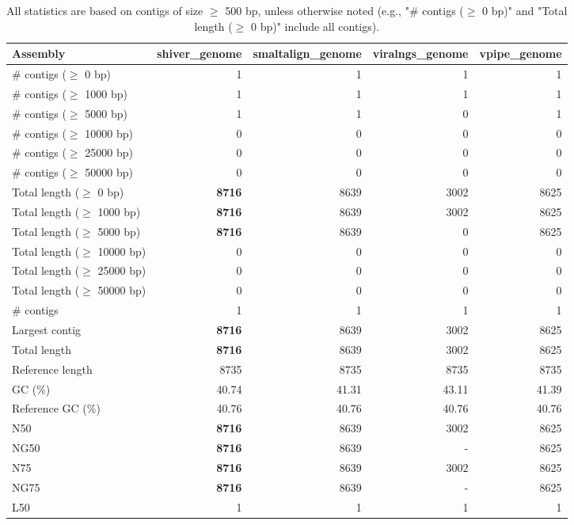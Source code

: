 \documentclass[12pt,a4paper]{article}
\begin{document}
\begin{table}[ht]
\begin{center}
\caption{All statistics are based on contigs of size $\geq$ 500 bp, unless otherwise noted (e.g., "\# contigs ($\geq$ 0 bp)" and "Total length ($\geq$ 0 bp)" include all contigs).}
\begin{tabular}{|l*{4}{|r}|}
\hline
Assembly & shiver\_genome & smaltalign\_genome & viralngs\_genome & vpipe\_genome \\ \hline
\# contigs ($\geq$ 0 bp) & 1 & 1 & 1 & 1 \\ \hline
\# contigs ($\geq$ 1000 bp) & 1 & 1 & 1 & 1 \\ \hline
\# contigs ($\geq$ 5000 bp) & 1 & 1 & 0 & 1 \\ \hline
\# contigs ($\geq$ 10000 bp) & 0 & 0 & 0 & 0 \\ \hline
\# contigs ($\geq$ 25000 bp) & 0 & 0 & 0 & 0 \\ \hline
\# contigs ($\geq$ 50000 bp) & 0 & 0 & 0 & 0 \\ \hline
Total length ($\geq$ 0 bp) & {\bf 8716} & 8639 & 3002 & 8625 \\ \hline
Total length ($\geq$ 1000 bp) & {\bf 8716} & 8639 & 3002 & 8625 \\ \hline
Total length ($\geq$ 5000 bp) & {\bf 8716} & 8639 & 0 & 8625 \\ \hline
Total length ($\geq$ 10000 bp) & 0 & 0 & 0 & 0 \\ \hline
Total length ($\geq$ 25000 bp) & 0 & 0 & 0 & 0 \\ \hline
Total length ($\geq$ 50000 bp) & 0 & 0 & 0 & 0 \\ \hline
\# contigs & 1 & 1 & 1 & 1 \\ \hline
Largest contig & {\bf 8716} & 8639 & 3002 & 8625 \\ \hline
Total length & {\bf 8716} & 8639 & 3002 & 8625 \\ \hline
Reference length & 8735 & 8735 & 8735 & 8735 \\ \hline
GC (\%) & 40.74 & 41.31 & 43.11 & 41.39 \\ \hline
Reference GC (\%) & 40.76 & 40.76 & 40.76 & 40.76 \\ \hline
N50 & {\bf 8716} & 8639 & 3002 & 8625 \\ \hline
NG50 & {\bf 8716} & 8639 & - & 8625 \\ \hline
N75 & {\bf 8716} & 8639 & 3002 & 8625 \\ \hline
NG75 & {\bf 8716} & 8639 & - & 8625 \\ \hline
L50 & 1 & 1 & 1 & 1 \\ \hline

\end{tabular}
\end{center}
\end{table}
\end{document}
